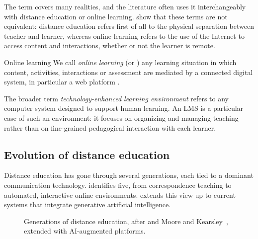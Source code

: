 The term  covers many realities, and the literature
often uses it interchangeably with distance education or online learning.
\citet{moore2011} show that these terms are not equivalent: distance
education refers first of all to the physical separation between teacher
and learner, whereas online learning refers to the use of the Internet to
access content and interactions, whether or not the learner is remote.

\begin{definitionbox}{Online learning}
We call \emph{online learning} (or ) any learning
situation in which content, activities, interactions or assessment are
mediated by a connected digital system, in particular a web platform
\cite{clark2016,moore2011}.
\end{definitionbox}

The broader term \emph{technology-enhanced learning environment} refers to
any computer system designed to support human learning. An LMS is a
particular case of such an environment: it focuses on organizing and
managing teaching rather than on fine-grained pedagogical interaction with
each learner.

\subsection{Evolution of distance education}

Distance education has gone through several generations, each tied to a
dominant communication technology. \citet{taylor2001} identifies five, from
correspondence teaching to automated, interactive online environments.
 extends this view up to current systems that
integrate generative artificial intelligence.

\begin{figure}[htbp]
\centering
{}
\caption[Generations of distance education]{Generations of distance
education, after \citet{taylor2001} and Moore and Kearsley~\cite{moore2012},
extended with AI-augmented platforms.}
\label{fig-generations}
\end{figure}


